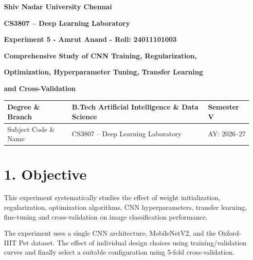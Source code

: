 \documentclass[10pt]{article}
\begin{document}

\begin{center}

{\large\textbf{Shiv Nadar University Chennai}}

\vspace{2mm}

{\normalsize\textbf{CS3807 -- Deep Learning Laboratory}}

\vspace{2mm}

{\large\textbf{Experiment 5 - Amrut Anand - Roll: 24011101003}}

\vspace{1mm}

{\normalsize\textbf{Comprehensive Study of CNN Training, Regularization,}}

{\normalsize\textbf{Optimization, Hyperparameter Tuning, Transfer Learning}}

{\normalsize\textbf{and Cross-Validation}}

\end{center}

\vspace{3mm}

\begin{tabular}{|p{3.4cm}|p{9.0cm}|p{1.4cm}|}
\hline
Degree \& Branch &
B.Tech Artificial Intelligence \& Data Science &
Semester V\\
\hline
Subject Code \& Name &
CS3807 -- Deep Learning Laboratory &
AY: 2026--27\\
\hline
\end{tabular}

\section*{1. Objective}

This experiment systematically studies the effect of
weight initialization, regularization, optimization algorithms, CNN
hyperparameters, transfer learning, fine-tuning and cross-validation on
image classification performance.

The experiment uses a single CNN architecture, MobileNetV2, and the
Oxford-IIIT Pet dataset. The effect of individual
design choices using training/validation curves and finally select a
suitable configuration using 5-fold cross-validation.
\end{document}
